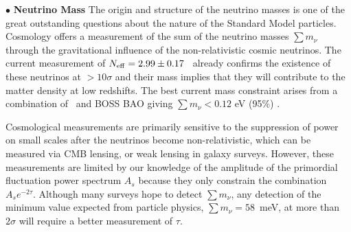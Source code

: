 \documentclass[PICOReport.tex]{subfiles}
\begin{document}
\noindent$\bullet$ {\bf Neutrino Mass} \hspace{0.1in} \label{neutrino_fundamental} The origin and structure of the neutrino masses is one of the great outstanding  questions about the nature of the Standard Model particles.  
Cosmology offers a  measurement of the sum of the neutrino masses $\sum m_\nu$ through the gravitational influence of the non-relativistic  cosmic neutrinos.  The current measurement of ${N_{\rm eff}} = 2.99 \pm 0.17$~\citep{Planck2018_VI} already confirms the existence of these neutrinos at $>10\sigma$ and their mass implies that they will contribute to the matter density at low redshifts.  The best current mass constraint arises from a combination of  \planck~and BOSS \ac{BAO} giving $\sum m_\nu < 0.12$ eV (95\%) \cite{Planck2018_VI}.

Cosmological measurements are primarily sensitive to the suppression of power on small scales after the neutrinos become non-relativistic, which can be measured via CMB lensing, or weak lensing in galaxy surveys.  However, these measurements are limited by our knowledge of the amplitude of the primordial fluctuation power spectrum $A_s$ because they only constrain the combination $A_s e^{-2 \tau}$. Although many surveys hope to detect $\sum m_\nu$, any detection of the minimum value expected from particle physics, $\sum m_\nu = 58$~meV, at more than $2 \sigma$ will require a better measurement of $\tau$.
\end{document}
